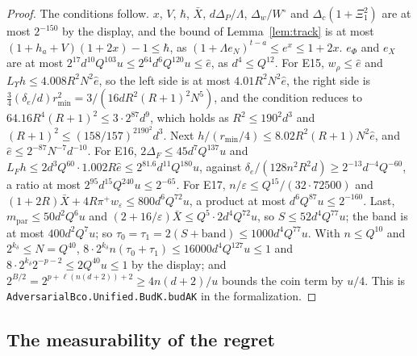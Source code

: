 \documentclass[11pt]{amsart}
\theoremstyle{definition}
\numberwithin{equation}{section}
\begin{document}
\begin{proof}
The conditions follow. $x$, $V$, $\hbar$, $\bar X$, $d\Delta_P/\Lambda$, $\Delta_w/W^\circ$ and $\Delta_c(1+\Xi_1^2)$ are at most $2^{-150}$ by the display, and the bound of Lemma~\ref{lem:track} is at most $(1+h_a+V)(1+2x)-1\le\hbar$, as $(1+\Lambda e_N)^{t-a}\le e^x\le1+2x$. $e_\Phi$ and $e_X$ are at most $2^{17}d^{10}Q^{103}u\le2^{64}d^6Q^{120}u\le\hat e$, as $d^4\le Q^{12}$. For E15, $w_\rho\le\hat e$ and $L_\Upsilon h\le4.008R^2N^2\hat e$, so the left side is at most $4.01R^2N^2\hat e$, the right side is $\frac34(\delta_e/d)r_{\min}^2=3/(16dR^2(R+1)^2N^5)$, and the condition reduces to $64.16R^4(R+1)^2\le3\cdot2^{87}d^9$, which holds as $R^2\le190^2d^3$ and $(R+1)^2\le(158/157)^2190^2d^3$. Next $h/(r_{\min}/4)\le8.02R^2(R+1)N^2\hat e$, and $\hat e\le2^{-87}N^{-7}d^{-10}$. For E16, $2\Delta_F\le45d^7Q^{137}u$ and $L_Fh\le2d^3Q^{60}\cdot1.002R\hat e\le2^{81.6}d^{11}Q^{180}u$, against $\delta_e/(128n^2R^2d)\ge2^{-13}d^{-4}Q^{-60}$, a ratio at most $2^{95}d^{15}Q^{240}u\le2^{-65}$. For E17, $n/\varepsilon\le Q^{15}/(32\cdot72500)$ and $(1+2R)\bar X+4R\pi^+w_\varepsilon\le800d^6Q^{72}u$, a product at most $d^6Q^{87}u\le2^{-160}$. Last, $m_{\mathrm{par}}\le50d^2Q^6u$ and $(2+16/\varepsilon)\bar X\le Q^5\cdot2d^4Q^{72}u$, so $S\le52d^4Q^{77}u$; the band is at most $400d^2Q^7u$; so $\tau_0=\tau_1=2(S+\mathrm{band})\le1000d^4Q^{77}u$. With $n\le Q^{10}$ and $2^{k_\delta}\le N=Q^{40}$, $8\cdot2^{k_\delta}n(\tau_0+\tau_1)\le16000d^4Q^{127}u\le1$ and $8\cdot2^{k_\delta}2^{-p-2}\le2Q^{40}u\le1$ by the display; and $2^{B/2}=2^{p+\ell(n(d+2))+2}\ge4n(d+2)/u$ bounds the coin term by $u/4$.
This is \texttt{AdversarialBco.Unified.BudK.budAK} in the formalization.
\end{proof}

\subsection{The measurability of the regret}
\end{document}
